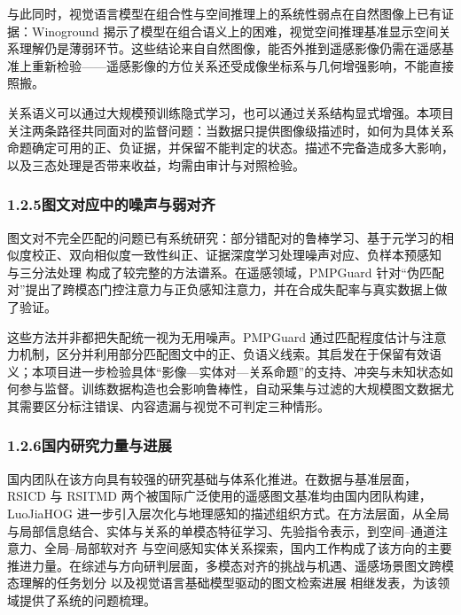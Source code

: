 与此同时，视觉语言模型在组合性与空间推理上的系统性弱点在自然图像上已有证据：Winoground 揭示了模型在组合语义上的困难\cite{thrush2022winoground}，视觉空间推理基准显示空间关系理解仍是薄弱环节\cite{liu2023vsr}。这些结论来自自然图像，能否外推到遥感影像仍需在遥感基准上重新检验——遥感影像的方位关系还受成像坐标系与几何增强影响，不能直接照搬。

关系语义可以通过大规模预训练隐式学习\cite{liu2024remoteclip,zhang2024rs5m,guo2024skysense}，也可以通过关系结构显式增强\cite{zhang2023unimodal,wu2024scat,shui2025esrn}。本项目关注两条路径共同面对的监督问题：当数据只提供图像级描述时，如何为具体关系命题确定可用的正、负证据，并保留不能判定的状态。描述不完备造成多大影响，以及三态处理是否带来收益，均需由审计与对照检验。

\subsubsection*{1.2.5\quad 图文对应中的噪声与弱对齐}

图文对不完全匹配的问题已有系统研究：部分错配对的鲁棒学习\cite{hu2023rcl}、基于元学习的相似度校正\cite{han2023msc}、双向相似度一致性纠正\cite{yang2023bicro}、证据深度学习处理噪声对应\cite{qin2022decl}、负样本预感知\cite{zhang2024npc} 与三分法处理\cite{feng2024tripartition} 构成了较完整的方法谱系。在遥感领域，PMPGuard 针对“伪匹配对”提出了跨模态门控注意力与正负感知注意力，并在合成失配率与真实数据上做了验证\cite{pmpguard2026}。

这些方法并非都把失配统一视为无用噪声。PMPGuard 通过匹配程度估计与注意力机制，区分并利用部分匹配图文中的正、负语义线索\cite{pmpguard2026}。其启发在于保留有效语义；本项目进一步检验具体“影像—实体对—关系命题”的支持、冲突与未知状态如何参与监督。训练数据构造也会影响鲁棒性\cite{nguyen2022quality}，自动采集与过滤的大规模图文数据\cite{schuhmann2022laion}尤其需要区分标注错误、内容遗漏与视觉不可判定三种情形。

\subsubsection*{1.2.6\quad 国内研究力量与进展}

国内团队在该方向具有较强的研究基础与体系化推进。在数据与基准层面，RSICD\cite{lu2018rsicd} 与 RSITMD\cite{yuan2022amfmn} 两个被国际广泛使用的遥感图文基准均由国内团队构建，LuoJiaHOG\cite{zhao2025luojiahog} 进一步引入层次化与地理感知的描述组织方式。在方法层面，从全局与局部信息结合\cite{yuan2022galr}、实体与关系的单模态特征学习\cite{zhang2023unimodal}、先验指令表示\cite{pan2023pir}，到空间--通道注意力\cite{wu2024scat}、全局--局部软对齐\cite{zhang2024glisa} 与空间感知实体关系探索\cite{shui2025esrn}，国内工作构成了该方向的主要推进力量。在综述与方向研判层面，多模态对齐的挑战与机遇\cite{lishutao2025alignment}、遥感场景图文跨模态理解的任务划分\cite{zhengxiangtao2025crossmodal} 以及视觉语言基础模型驱动的图文检索进展\cite{wuhui2026rsitr} 相继发表，为该领域提供了系统的问题梳理。

